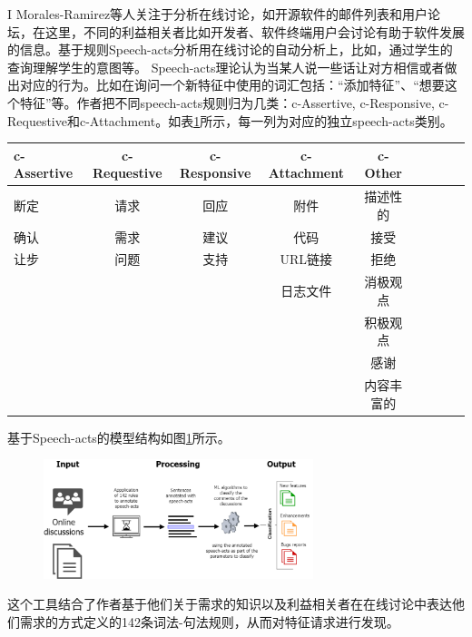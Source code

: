 I Morales-Ramirez等人\cite{Morales2019Speech}关注于分析在线讨论，如开源软件的邮件列表和用户论坛，在这里，不同的利益相关者比如开发者、软件终端用户会讨论有助于软件发展的信息。基于规则Speech-acts分析\cite{morales2014discovering}用在线讨论的自动分析上，比如，通过学生的查询理解学生的意图\cite{feng2006intelligent}等。 Speech-acts理论认为当某人说一些话让对方相信或者做出对应的行为\cite{acts1969essay}。比如在询问一个新特征中使用的词汇包括：“添加特征”、“想要这个特征”等。作者把不同speech-acts规则归为几类：c-Assertive, c-Responsive, c-Requestive和c-Attachment。如表\ref{tab:speech-act0}所示，每一列为对应的独立speech-acts类别。
\begin{table}[htb]
    \label{tab:speech-act0}
    \centering
    \footnotesize%
    \setlength{\tabcolsep}{4pt}%
    \renewcommand{\arraystretch}{1.2}%
\begin{tabular}{lcccccccc}
\hline
c-Assertive & c-Requestive & c-Responsive & c-Attachment & c-Other          \\
\hline
断定        & 请求         & 回应         & 附件         & 描述性的      \\
确认        & 需求         & 建议         & 代码         & 接受           \\
让步        & 问题         & 支持         & URL链接      & 拒绝           \\
            &              &              & 日志文件     & 消极观点 \\
            &              &              &              & 积极观点  \\
            &              &              &              & 感谢            \\
            &              &              &              & 内容丰富的 \\
\hline            
\end{tabular}
\end{table}
基于Speech-acts的模型结构如图\ref{fig:speech-acts1}所示。
\begin{figure}[htb]
    \centering
    \includegraphics[width=0.70\textwidth]{Img/speech-acts1.png}
    \label{fig:speech-acts1}
\end{figure}
这个工具结合了作者基于他们关于需求的知识以及利益相关者在在线讨论中表达他们需求的方式定义的142条词法-句法规则，从而对特征请求进行发现。

